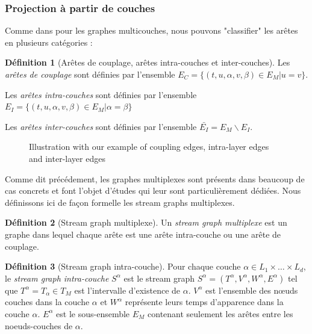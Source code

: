 \documentclass[11pt,a4paper]{article}
\theoremstyle{definition}
\newtheorem{defn}{Définition}
\theoremstyle{remark}
\theoremstyle{remark}
\begin{document}
	


\subsubsection{Projection à partir de couches}
Comme dans \cite{mlkiv} pour les graphes multicouches, nous pouvons "classifier" les arêtes en plusieurs catégories :
	
	\begin{defn}[Arêtes de couplage, arêtes intra-couches et inter-couches]

   	Les {\em arêtes de couplage} sont définies par l'ensemble $E_C=\{(t,u,\alpha,v,\beta)\in E_M | u=v\}$.

    Les {\em arêtes intra-couches} sont définies par l'ensemble $E_I = \{(t,u,\alpha,v,\beta) \in E_M | \alpha = \beta \}$

    Les {\em arêtes inter-couches} sont définies par l'ensemble $\bar{E_I} = E_M\backslash E_I$.
    
	
	\end{defn}	
	
	\begin{figure}[h]
		\centering
		\caption{Illustration with our example of coupling edges, intra-layer edges and inter-layer edges}
		\label{exIntraInter}
	\end{figure}
	
	
	Comme dit précédement, les graphes multiplexes sont présents dans beaucoup de cas concrets et font l'objet d'études qui leur sont particulièrement dédiées. Nous définissons ici de façon formelle les stream graphs multiplexes.
	
	\begin{defn}[Stream graph multiplexe]	
	Un {\em stream graph multiplexe} est un graphe dans lequel chaque arête est une arête intra-couche ou une arête de couplage.
	\end{defn}
	
	
	 
	\begin{defn}[Stream graph intra-couche]
	Pour chaque couche $\alpha \in L_1 \times \dots \times L_d$, le {\em stream graph intra-couche} $S^{\alpha}$ est le stream graph $S^{\alpha}=(T^{\alpha},V^{\alpha},W^{\alpha},E^{\alpha})$ tel que $T^{\alpha} = T_{\alpha} \in T_M$ est l'intervalle d'existence de $\alpha$. $V^{\alpha}$ est l'ensemble des nœuds couches dans la couche $\alpha$ et $W^{\alpha}$ représente leurs temps d'apparence dans la couche $\alpha$. $E^{\alpha}$ est le sous-ensemble $E_M$ contenant seulement les arêtes entre les noeuds-couches de $\alpha$.
	\end{defn}
	
\end{document}
